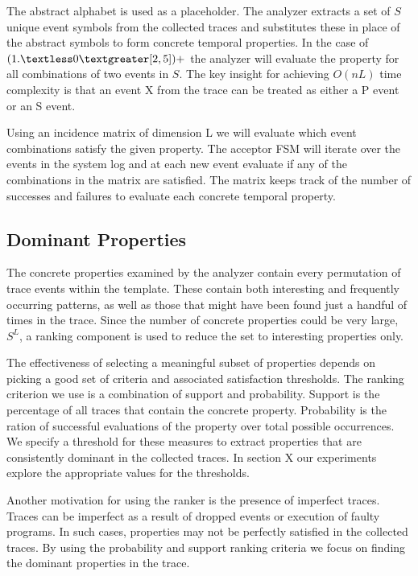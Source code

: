 \documentclass[]{sigplanconf}
\begin{document}
The abstract alphabet is used as a placeholder. The analyzer extracts a set of $S$ unique event symbols from the collected traces and substitutes these in place of the abstract symbols to form concrete temporal properties. In the case of $(1.\textless0\textgreater[2,5])+$ the analyzer will evaluate the property for all combinations of two events in $S$. The key insight for achieving $O(nL)$ time complexity is that an event X from the trace can be treated as either a P event or an S event.


Using an incidence matrix of dimension L we will evaluate which event combinations satisfy the given property. The acceptor FSM will iterate over the events in the system log and at each new event evaluate if any of the combinations in the matrix are satisfied. The matrix keeps track of the number of successes and failures to evaluate each concrete temporal property.

\subsection{Dominant Properties}

The concrete properties examined by the analyzer contain every permutation of trace events within the template. These contain both interesting and frequently occurring patterns, as well as those that might have been found just a handful of times in the trace. Since the number of concrete properties could be very large, $S^L$, a ranking component is used to reduce the set to interesting properties only.

The effectiveness of selecting a meaningful subset of properties depends on picking a good set of criteria and associated satisfaction thresholds. The ranking criterion we use is a combination of support and probability. Support is the percentage of all traces that contain the concrete property. Probability is the ration of successful evaluations of the property over total possible occurrences. We specify a threshold for these measures to extract properties that are consistently dominant in the collected traces. In section X our experiments explore the appropriate values for the thresholds.

Another motivation for using the ranker is the presence of imperfect traces. Traces can be imperfect as a result of dropped events or execution of faulty programs. In such cases, properties may not be perfectly satisfied in the collected traces. By using the probability and support ranking criteria we focus on finding the dominant properties in the trace.
\end{document}
